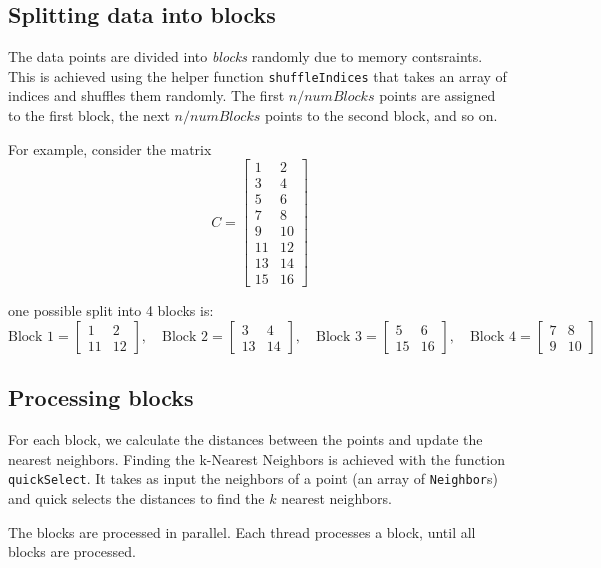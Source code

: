 \documentclass{article}
\begin{document}
\subsection{Splitting data into blocks}
The data points are divided into \emph{blocks} randomly due to memory contsraints. This is achieved using the helper 
function \texttt{shuffleIndices} that takes an array of indices and shuffles them randomly. The first $n / numBlocks$ 
points are assigned to the first block, the next $n / numBlocks$ points to the second block, and so on.

For example, consider the matrix 
\[
C = \begin{bmatrix}
1 & 2 \\
3 & 4 \\
5 & 6 \\
7 & 8 \\
9 & 10 \\
11 & 12 \\
13 & 14 \\
15 & 16
\end{bmatrix}
\]

one possible split into 4 blocks is:
\[
\text{Block 1} = \begin{bmatrix}
1 & 2 \\
11 & 12
\end{bmatrix}, \quad
\text{Block 2} = \begin{bmatrix}
3 & 4 \\
13 & 14
\end{bmatrix}, \quad
\text{Block 3} = \begin{bmatrix}
5 & 6 \\
15 & 16
\end{bmatrix}, \quad
\text{Block 4} = \begin{bmatrix}
7 & 8 \\
9 & 10
\end{bmatrix}
\]


\subsection{Processing blocks}
For each block, we calculate the distances between the points and update the nearest neighbors.
Finding the k-Nearest Neighbors is achieved with the function \texttt{quickSelect}. It takes as input
the neighbors of a point (an array of \texttt{Neighbor}s) and quick selects the distances to find the $k$ nearest neighbors.

The blocks are processed in parallel. Each thread processes a block, until all blocks are processed.
\end{document}
